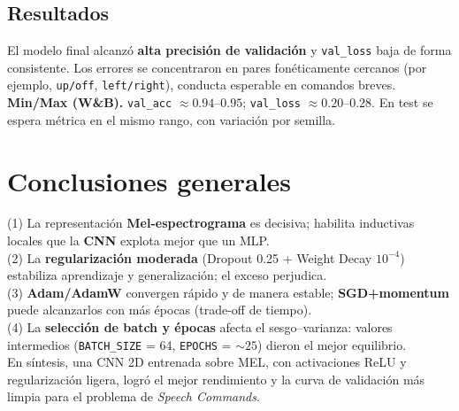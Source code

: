 \documentclass[12pt,a4paper]{article}
\begin{document}
\subsection*{Resultados}
\noindent
El modelo final alcanzó \textbf{alta precisión de validación} y \texttt{val\_loss} baja de forma consistente. Los errores se concentraron en pares fonéticamente cercanos (por ejemplo, \texttt{up/off}, \texttt{left/right}), conducta esperable en comandos breves.\\
\textbf{Min/Max (W\&B).} \texttt{val\_acc} \(\approx 0.94\)–\(0.95\); \texttt{val\_loss} \(\approx 0.20\)–\(0.28\). En test se espera métrica en el mismo rango, con variación por semilla.

\section*{Conclusiones generales}
\noindent
(1) La representación \textbf{Mel-espectrograma} es decisiva; habilita inductivas locales que la \textbf{CNN} explota mejor que un MLP.\\
(2) La \textbf{regularización moderada} (Dropout 0.25 + Weight Decay \(10^{-4}\)) estabiliza aprendizaje y generalización; el exceso perjudica.\\
(3) \textbf{Adam/AdamW} convergen rápido y de manera estable; \textbf{SGD+momentum} puede alcanzarlos con más épocas (trade-off de tiempo).\\
(4) La \textbf{selección de batch y épocas} afecta el sesgo–varianza: valores intermedios (\texttt{BATCH\_SIZE} = 64, \texttt{EPOCHS} = \(\sim 25\)) dieron el mejor equilibrio.\\
En síntesis, una CNN 2D entrenada sobre MEL, con activaciones ReLU y regularización ligera, logró el mejor rendimiento y la curva de validación más limpia para el problema de \textit{Speech Commands}.
\end{document}
